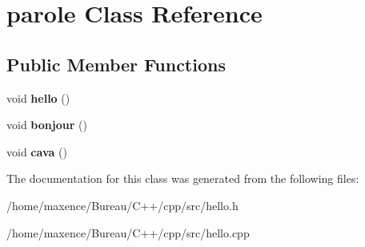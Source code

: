 \hypertarget{classparole}{}\section{parole Class Reference}
\label{classparole}
\subsection*{Public Member Functions}
\begin{DoxyCompactItemize}
\item 
\mbox{\label{classparole_a82fe24e2cef4bd804239d48fe5429551}} 
void {\bfseries hello} ()
\item 
\mbox{\label{classparole_aa88d16f5246e0454a625a624babc9d0b}} 
void {\bfseries bonjour} ()
\item 
\mbox{\label{classparole_afb6f8c271d05522d50774730c42c40c9}} 
void {\bfseries cava} ()
\end{DoxyCompactItemize}


The documentation for this class was generated from the following files\+:\begin{DoxyCompactItemize}
\item 
/home/maxence/\+Bureau/\+C++/cpp/src/hello.\+h\item 
/home/maxence/\+Bureau/\+C++/cpp/src/hello.\+cpp\end{DoxyCompactItemize}
